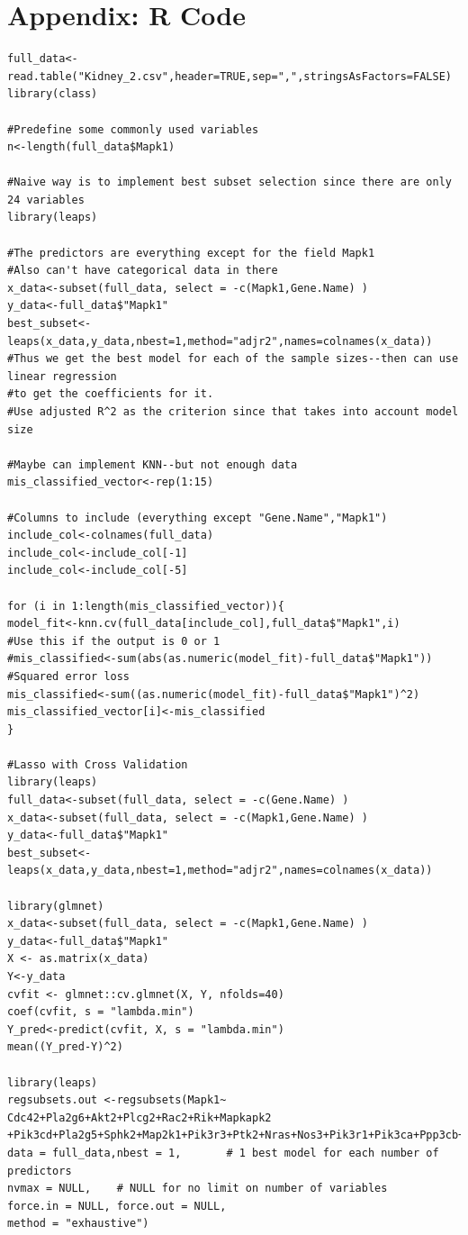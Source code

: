 \documentclass{article}
\begin{document}
\section{Appendix: R Code}
\begin{lstlisting}[frame=single,style=base]
full_data<-read.table("Kidney_2.csv",header=TRUE,sep=",",stringsAsFactors=FALSE)
library(class)

#Predefine some commonly used variables
n<-length(full_data$Mapk1)

#Naive way is to implement best subset selection since there are only 24 variables
library(leaps)

#The predictors are everything except for the field Mapk1
#Also can't have categorical data in there
x_data<-subset(full_data, select = -c(Mapk1,Gene.Name) )
y_data<-full_data$"Mapk1"
best_subset<-leaps(x_data,y_data,nbest=1,method="adjr2",names=colnames(x_data))
#Thus we get the best model for each of the sample sizes--then can use linear regression
#to get the coefficients for it.
#Use adjusted R^2 as the criterion since that takes into account model size

#Maybe can implement KNN--but not enough data 
mis_classified_vector<-rep(1:15)

#Columns to include (everything except "Gene.Name","Mapk1")
include_col<-colnames(full_data)
include_col<-include_col[-1]
include_col<-include_col[-5]

for (i in 1:length(mis_classified_vector)){
model_fit<-knn.cv(full_data[include_col],full_data$"Mapk1",i)
#Use this if the output is 0 or 1
#mis_classified<-sum(abs(as.numeric(model_fit)-full_data$"Mapk1"))
#Squared error loss
mis_classified<-sum((as.numeric(model_fit)-full_data$"Mapk1")^2)
mis_classified_vector[i]<-mis_classified
}

#Lasso with Cross Validation
library(leaps)
full_data<-subset(full_data, select = -c(Gene.Name) )
x_data<-subset(full_data, select = -c(Mapk1,Gene.Name) )
y_data<-full_data$"Mapk1"
best_subset<-leaps(x_data,y_data,nbest=1,method="adjr2",names=colnames(x_data))

library(glmnet)
x_data<-subset(full_data, select = -c(Mapk1,Gene.Name) )
y_data<-full_data$"Mapk1"
X <- as.matrix(x_data)
Y<-y_data
cvfit <- glmnet::cv.glmnet(X, Y, nfolds=40)
coef(cvfit, s = "lambda.min")
Y_pred<-predict(cvfit, X, s = "lambda.min")
mean((Y_pred-Y)^2)

library(leaps)
regsubsets.out <-regsubsets(Mapk1~ Cdc42+Pla2g6+Akt2+Plcg2+Rac2+Rik+Mapkapk2 +Pik3cd+Pla2g5+Sphk2+Map2k1+Pik3r3+Ptk2+Nras+Nos3+Pik3r1+Pik3ca+Ppp3cb+Map2k2+Nfatc4+Mapk13+Rac1+Nfat5,
data = full_data,nbest = 1,       # 1 best model for each number of predictors
nvmax = NULL,    # NULL for no limit on number of variables
force.in = NULL, force.out = NULL,
method = "exhaustive")


\end{lstlisting}
\end{document}
